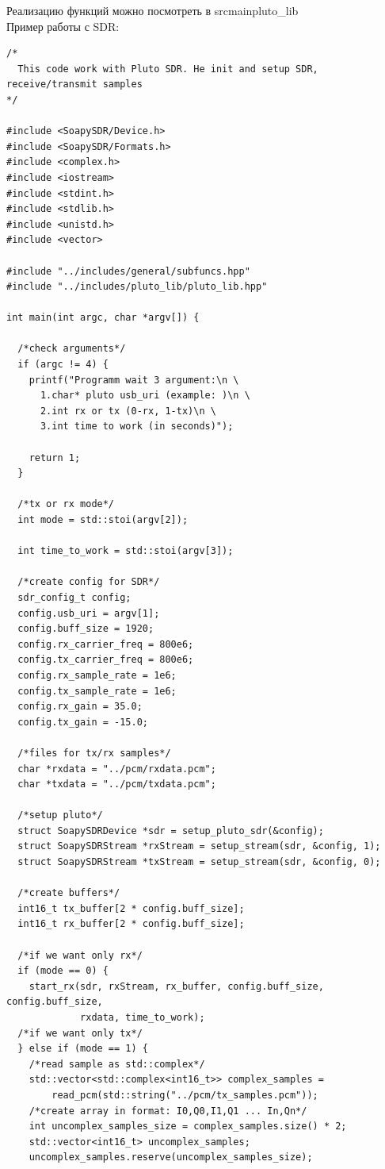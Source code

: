 Реализацию функций можно посмотреть в src\/main\/pluto\_lib \\

Пример работы с SDR:

\begin{lstlisting}
/*
  This code work with Pluto SDR. He init and setup SDR, receive/transmit samples
*/

#include <SoapySDR/Device.h>
#include <SoapySDR/Formats.h>
#include <complex.h>
#include <iostream>
#include <stdint.h>
#include <stdlib.h>
#include <unistd.h>
#include <vector>

#include "../includes/general/subfuncs.hpp"
#include "../includes/pluto_lib/pluto_lib.hpp"

int main(int argc, char *argv[]) {

  /*check arguments*/
  if (argc != 4) {
    printf("Programm wait 3 argument:\n \
      1.char* pluto usb_uri (example: )\n \
      2.int rx or tx (0-rx, 1-tx)\n \
      3.int time to work (in seconds)");

    return 1;
  }

  /*tx or rx mode*/
  int mode = std::stoi(argv[2]);

  int time_to_work = std::stoi(argv[3]);

  /*create config for SDR*/
  sdr_config_t config;
  config.usb_uri = argv[1];
  config.buff_size = 1920;
  config.rx_carrier_freq = 800e6;
  config.tx_carrier_freq = 800e6;
  config.rx_sample_rate = 1e6;
  config.tx_sample_rate = 1e6;
  config.rx_gain = 35.0;
  config.tx_gain = -15.0;

  /*files for tx/rx samples*/
  char *rxdata = "../pcm/rxdata.pcm";
  char *txdata = "../pcm/txdata.pcm";

  /*setup pluto*/
  struct SoapySDRDevice *sdr = setup_pluto_sdr(&config);
  struct SoapySDRStream *rxStream = setup_stream(sdr, &config, 1);
  struct SoapySDRStream *txStream = setup_stream(sdr, &config, 0);

  /*create buffers*/
  int16_t tx_buffer[2 * config.buff_size];
  int16_t rx_buffer[2 * config.buff_size];

  /*if we want only rx*/
  if (mode == 0) {
    start_rx(sdr, rxStream, rx_buffer, config.buff_size, config.buff_size,
             rxdata, time_to_work);
  /*if we want only tx*/
  } else if (mode == 1) {
    /*read sample as std::complex*/
    std::vector<std::complex<int16_t>> complex_samples =
        read_pcm(std::string("../pcm/tx_samples.pcm"));
    /*create array in format: I0,Q0,I1,Q1 ... In,Qn*/
    int uncomplex_samples_size = complex_samples.size() * 2;
    std::vector<int16_t> uncomplex_samples;
    uncomplex_samples.reserve(uncomplex_samples_size);


\end{lstlisting}
